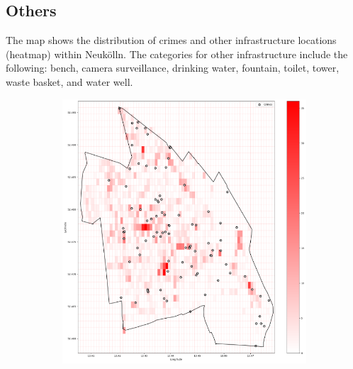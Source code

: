 \subsection{Others}
The map shows the distribution of crimes and other infrastructure locations (heatmap) within Neukölln. The categories for other infrastructure include the following: bench, camera surveillance, drinking water, fountain, toilet, tower, waste basket, and water well. 
\begin{figure}[h]
    \centering
    \begin{subfigure}[b]{0.45\textwidth}
        \centering
        \includegraphics[width=\textwidth]{./figures/Gerard/others.png}
        \caption{}
        \label{fig:image1}
    \end{subfigure}
    \hfill
    \begin{subfigure}[b]{0.45\textwidth}
        \centering

\end{subfigure}
\end{figure}
